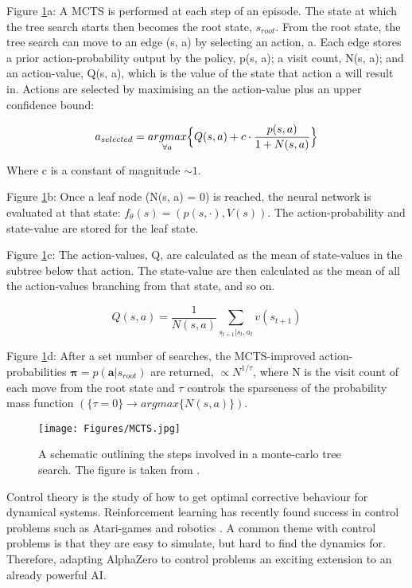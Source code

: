 \documentclass[12pt]{article}
\begin{document}
Figure \ref{fig:MCTS}a:
A MCTS is performed at each step of an episode. The state at which the tree search starts then becomes the root state, $s_{root}$. From the root state, the tree search can move to an edge (s, a) by selecting an action, a. Each edge stores a prior action-probability output by the policy, p(s, a); a visit count, N(s, a); and an action-value, Q(s, a), which is the value of the state that action a will result in. Actions are selected by maximising an the action-value plus an upper confidence bound:

\begin{equation}
   a_{selected} = \underset{\forall a}{argmax} \Big{\{}Q(s, a) + c \cdot \frac{p(s, a)}{1 + N(s, a)}\Big{\}}
   \label{eqn:ucb}
\end{equation}

Where c is a constant of magnitude $\sim 1$.

Figure \ref{fig:MCTS}b:
Once a leaf node (N(s, a) = 0) is reached, the neural network is evaluated at that state: $f_\theta (s) = (p(s, \cdot), V(s))$. The action-probability and state-value are stored for the leaf state.

Figure \ref{fig:MCTS}c:
The action-values, Q, are calculated as the mean of state-values in the subtree below that action. The state-value are then calculated as the mean of all the action-values branching from that state, and so on.

\begin{equation}
   Q(s, a) = \frac{1}{N(s, a)} \sum_{s_{t+1} | s_t, a_t} v(s_{t+1})
   \label{eqn:actionvalue}
\end{equation} 

Figure \ref{fig:MCTS}d:
After a set number of searches, the MCTS-improved action-probabilities $\boldsymbol{\pi} = p(\boldsymbol{a} | s_{root})$ are returned, $\propto N^{1/\tau}$, where N is the visit count of each move from the root state and $\tau$ controls the sparseness of the probability mass function $(\{\tau = 0\} \rightarrow argmax\{N(s, a)\})$.

\begin{figure}[H]
   \centering
   \texttt{[image: Figures/MCTS.jpg]}
   \caption{\label{fig:MCTS} A schematic outlining the steps involved in a monte-carlo tree search. The figure is taken from \cite{AlphaGoZero}.}
\end{figure}

Control theory is the study of how to get optimal corrective behaviour for dynamical systems. Reinforcement learning has recently found success in control problems such as Atari-games and robotics \cite{RLoverview}. A common theme with control problems is that they are easy to simulate, but hard to find the dynamics for. Therefore, adapting AlphaZero to control problems an exciting extension to an already powerful AI.
\end{document}
